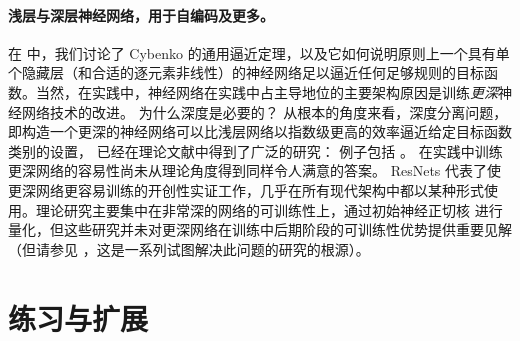 \documentclass[../../book-main_zh.tex]{subfiles}
\begin{document}
\paragraph{浅层与深层神经网络，用于自编码及更多。}
在  中，我们讨论了 Cybenko 的通用逼近定理，以及它如何说明原则上一个具有单个隐藏层（和合适的逐元素非线性）的神经网络足以逼近任何足够规则的目标函数。当然，在实践中，神经网络在实践中占主导地位的主要架构原因是训练\textit{更深}神经网络技术的改进。
为什么深度是必要的？
从根本的角度来看，深度分离问题，即构造一个更深的神经网络可以比浅层网络以指数级更高的效率逼近给定目标函数类别的设置，
已经在理论文献中得到了广泛的研究：
例子包括 \cite{Telgarsky2016-sn,Bresler2020-xy,Venturi2021-qc}。
在实践中训练更深网络的容易性尚未从理论角度得到同样令人满意的答案。
ResNets \cite{he2016deep} 代表了使更深网络更容易训练的开创性实证工作，几乎在所有现代架构中都以某种形式使用。理论研究主要集中在非常深的网络的可训练性上，通过初始神经正切核 \cite{Buchanan2021-sj,Martens2021-cx} 进行量化，但这些研究并未对更深网络在训练中后期阶段的可训练性优势提供重要见解（但请参见 \cite{Yang2021-gw}，这是一系列试图解决此问题的研究的根源）。

\section{练习与扩展}
\end{document}
